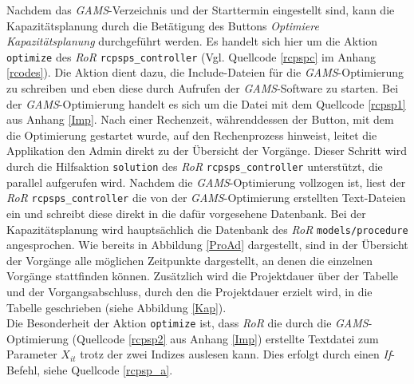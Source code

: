 \documentclass[a4paper,12pt,parskip,bibtotoc,liststotoc]{article}
\begin{document}
Nachdem das \textit{GAMS}-Verzeichnis und der Starttermin eingestellt sind, kann die Kapazitäts\-planung durch die Betätigung des Buttons \textit{Optimiere Kapazitätsplanung} durchgeführt werden. Es handelt sich hier um die Aktion \texttt{optimize} des \textit{RoR} \texttt{rcpsps\_controller} (Vgl. Quellcode \ref{rcpspc} im Anhang \ref{rcodes}). Die Aktion dient dazu, die Include-Dateien für die \textit{GAMS}-Opti\-mierung zu schreiben und eben diese durch Aufrufen der \textit{GAMS}-Software zu starten. Bei der \textit{GAMS}-Optimierung handelt es sich um die Datei mit dem Quellcode \ref{rcpsp1} aus Anhang \ref{Imp}. Nach einer Rechenzeit, währenddessen der Button, mit dem die Optimierung gestartet wurde, auf den Rechenprozess hinweist, leitet die Applikation den Admin direkt zu der Übersicht der Vorgänge. Dieser Schritt wird durch die Hilfsaktion \texttt{solution} des \textit{RoR} \texttt{rcpsps\_controller} unterstützt, die parallel aufgerufen wird. Nachdem die \textit{GAMS}-Optimierung vollzogen ist, liest der \textit{RoR} \texttt{rcpsps\_controller} die von der \textit{GAMS}-Optimierung erstellten Text-Dateien ein und schreibt diese direkt in die dafür vorgesehene Datenbank. Bei der Kapazitätsplanung wird hauptsächlich die Datenbank des \textit{RoR} \texttt{models/procedure} angesprochen. Wie bereits in Abbildung \ref{ProAd} dargestellt, sind in der Übersicht der Vorgänge alle möglichen Zeitpunkte dargestellt, an denen die einzelnen Vorgänge stattfinden können. Zusätzlich wird die Projektdauer über der Tabelle und der Vorgangsabschluss, durch den die Projektdauer erzielt wird, in die Tabelle geschrieben (siehe Abbildung \ref{Kap}).\\

Die Besonderheit der Aktion \texttt{optimize} ist, dass \textit{RoR} die durch die \textit{GAMS}-Optimierung (Quellcode \ref{rcpsp2} aus Anhang \ref{Imp}) erstellte Textdatei zum Parameter $X_{it}$ trotz der zwei Indizes auslesen kann. Dies erfolgt durch einen \textit{If}-Befehl, siehe Quellcode \ref{rcpsp_a}. %
\end{document}
